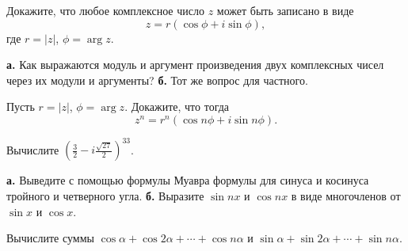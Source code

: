 \documentclass[a4paper, 12pt, num=21]{listok}
\begin{document}
\begin{problem}
	Докажите, что любое комплексное число $z$ может быть записано в виде
	\[
		z = r(\cos \phi + i \sin \phi),
	\]
	где $r = |z|$, $\phi = \arg z$.
\end{problem}
\begin{problem}
	\textbf{а.} Как выражаются модуль и аргумент произведения двух комплексных чисел через их модули и аргументы?
	\textbf{б.} Тот же вопрос для частного.
\end{problem}
\begin{problem}
	Пусть $r = |z|$, $\phi = \arg z$.
	Докажите, что тогда
	\[
		z^n = r^n (\cos{n\phi} + i \sin{n\phi}).
	\]
\end{problem}
\begin{problem}
	Вычислите ${\left ( \frac 3 2 - i \frac{\sqrt{27}}2 \right )}^{33}$.
\end{problem}
\begin{problem}
	\textbf{а.} Выведите с помощью формулы Муавра формулы для синуса и косинуса тройного и четверного угла.
	\textbf{б.} Выразите $\sin{nx}$ и $\cos{nx}$ в виде многочленов от $\sin x$ и $\cos x$.
\end{problem}
\begin{problem}
	Вычислите суммы $\cos \alpha + \cos{2\alpha} + \cdots + \cos{n\alpha}$ и $\sin \alpha + \sin{2\alpha} + \cdots + \sin{n\alpha}$.
\end{problem}
\end{document}
